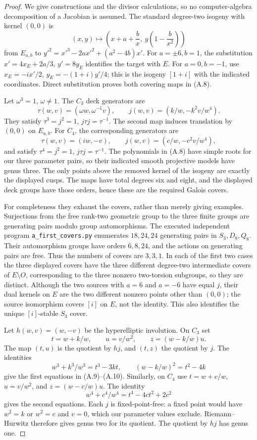 \begin{proof}
We give constructions and the divisor calculations, so no computer-algebra
decomposition of a Jacobian is assumed. The standard degree-two isogeny
with kernel $(0,0)$ is
\[
 (x,y)\longmapsto
 \left(x+a+\frac b x,\ y\left(1-\frac b{x^2}\right)\right)
\]
from $E_{a,b}$ to $y'^2=x'^3-2ax'^2+(a^2-4b)x'$. For
$a=\pm6,b=1$, the substitution $x' =4x_E+2a/3$, $y'=8y_E$
identifies the target with $E$. For $a=0,b=-1$, use
$x_E=-ix'/2$, $y_E=-(1+i)y'/4$; this is the isogeny $[1+i]$
with the indicated coordinates. Direct substitution proves both
covering maps in (A.8).

Let $\omega^3=1$, $\omega\ne1$. The $C_3$ deck generators are
\[
 \tau(w,v)=(\omega w,\omega^{-1}v),\qquad
 j(w,v)=(k/w,-k^2v/w^4).
\]
They satisfy $\tau^3=j^2=1$, $j\tau j=\tau^{-1}$.
The second map induces translation by $(0,0)$ on $E_{a,b}$.
For $C_4$, the corresponding generators are
\[
 \tau(w,v)=(iw,-v),\qquad j(w,v)=(c/w,-c^2v/w^4),
\]
and satisfy $\tau^4=j^2=1$, $j\tau j=\tau^{-1}$.
The polynomials in (A.8) have simple roots for our three parameter
pairs, so their indicated smooth projective models have genus three.
The only points above the removed kernel of the isogeny are exactly
the displayed cusps. The maps have total degrees six and eight, and
the displayed deck groups have those orders, hence these are the
required Galois covers.

For completeness they exhaust the covers, rather than merely giving
examples. Surjections from the free rank-two geometric group to the
three finite groups are generating pairs modulo group automorphisms.
The executed independent program \texttt{a\_first\_covers.py}
enumerates $18,24,24$ generating pairs in $S_3,D_8,Q_8$.
Their automorphism groups have orders $6,8,24$, and the actions on
generating pairs are free. Thus the numbers of covers are $3,3,1$.
In each of the first two cases the three displayed covers have the
three different degree-two intermediate covers of $E\setminus O$,
corresponding to the three nonzero two-torsion subgroups, so they are
distinct. Although the two sources with $a=6$ and $a=-6$ have equal
$j$, their dual kernels on $E$ are the two different nonzero points
other than $(0,0)$; the source isomorphism covers $[i]$ on $E$, not
the identity. This also identifies the unique $[i]$-stable $S_3$ cover.

Let $h(w,v)=(w,-v)$ be the hyperelliptic involution. On $C_3$ set
\[
 t=w+k/w,\qquad u=v/w^2,\qquad z=(w-k/w)u.
\]
The map $(t,u)$ is the quotient by $hj$, and $(t,z)$ the quotient
by $j$. The identities
\[
 w^3+k^3/w^3=t^3-3kt,\qquad (w-k/w)^2=t^2-4k
\]
give the first equations in (A.9)--(A.10). Similarly, on $C_4$ use
$t=w+c/w$, $u=v/w^2$, and $z=(w-c/w)u$. The identity
\[
 w^4+c^4/w^4=t^4-4ct^2+2c^2
\]
gives the second equations. Each $j$ is fixed-point-free: a fixed
point would have $w^2=k$ or $w^2=c$ and $v=0$, which our parameter
values exclude. Riemann--Hurwitz therefore gives genus two for its
quotient. The quotient by $hj$ has genus one.


\end{proof}
